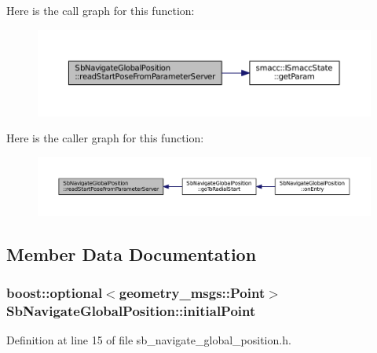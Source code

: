Here is the call graph for this function\+:
\nopagebreak
\begin{figure}[H]
\begin{center}
\leavevmode
\includegraphics[width=350pt]{classSbNavigateGlobalPosition_a497b26df556f99524164619deb5b2352_cgraph}
\end{center}
\end{figure}




Here is the caller graph for this function\+:
\nopagebreak
\begin{figure}[H]
\begin{center}
\leavevmode
\includegraphics[width=350pt]{classSbNavigateGlobalPosition_a497b26df556f99524164619deb5b2352_icgraph}
\end{center}
\end{figure}




\subsection{Member Data Documentation}
\subsubsection[{\texorpdfstring{initial\+Point}{initialPoint}}]{\setlength{\rightskip}{0pt plus 5cm}boost\+::optional$<$geometry\+\_\+msgs\+::\+Point$>$ Sb\+Navigate\+Global\+Position\+::initial\+Point}\hypertarget{classSbNavigateGlobalPosition_a676844c9140653b6bc60e8efaa75df44}{}\label{classSbNavigateGlobalPosition_a676844c9140653b6bc60e8efaa75df44}


Definition at line 15 of file sb\+\_\+navigate\+\_\+global\+\_\+position.\+h.



